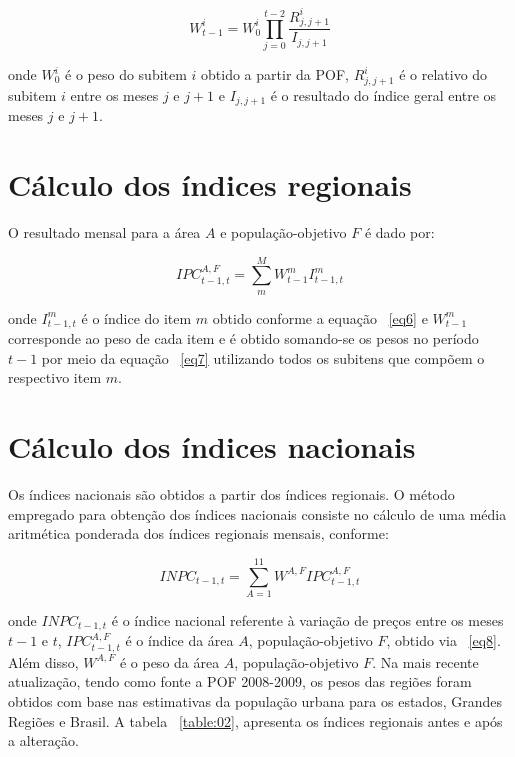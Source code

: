 \documentclass[twoside,a4paper,12pt]{report}
\begin{document}
{\begin{equation}\label{eq7}
{W}_{t-1}^{i}={W}_{0}^{i}\prod_{j=0}^{t-2}{\frac{{R}_{j,j+1}^{i}}{{I}_{j,j+1}}} 
\end{equation}

\noindent onde ${W}_{0}^{i}$ é o peso do subitem $i$ obtido a partir da POF, ${R}_{j,j+1}^{i}$ é o relativo do subitem $i$ entre os meses $j$ e $j+1$ e ${I}_{j,j+1}$ é o resultado do índice geral entre os meses $j$ e $j+1$.

\section*{Cálculo dos índices regionais}

O resultado mensal para a área $A$ e população-objetivo $F$ é dado por:

\begin{equation}\label{eq8}
{IPC}_{t-1,t}^{A,F}=\sum_{m}^{M}{{W}_{t-1}^{m}{I}_{t-1,t}^{m}} 
\end{equation}

\noindent onde ${I}_{t-1,t}^{m}$ é o índice do item $m$ obtido conforme a equação ~\ref{eq6} e ${W}_{t-1}^{m}$ corresponde ao peso de cada item e é obtido somando-se os pesos no período $t-1$ por meio da equação ~\ref{eq7} utilizando todos os subitens que compõem o respectivo item $m$.

\section*{Cálculo dos índices nacionais}

Os índices nacionais são obtidos a partir dos índices regionais. O método empregado para obtenção dos índices nacionais consiste no cálculo de uma média aritmética ponderada dos índices regionais mensais, conforme:

\begin{equation}\label{eq9}
{INPC}_{t-1,t}=\sum_{A=1}^{11}{{W}^{A,F}{IPC}_{t-1,t}^{A,F}}
\end{equation}

\noindent onde ${INPC}_{t-1,t}$ é o índice nacional referente à variação de preços entre os meses $t-1$ e $t$, ${IPC}_{t-1,t}^{A,F}$ é o índice da área $A$, população-objetivo $F$, obtido via ~\ref{eq8}. Além disso, ${W}^{A,F}$ é o peso da área $A$, população-objetivo $F$. Na mais recente atualização, tendo como fonte a POF 2008-2009, os pesos das regiões foram obtidos com base nas estimativas da população urbana para os estados, Grandes Regiões e Brasil. A tabela ~\ref{table:02}, apresenta os índices regionais antes e após a alteração. 

}
\end{document}
